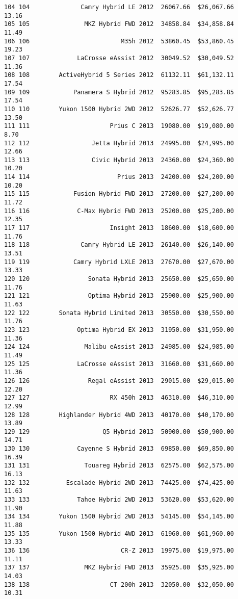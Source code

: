 \documentclass[
  letterpaper,
  DIV=11,
  numbers=noendperiod]{scrreprt}
\begin{document}
\begin{verbatim}
104 104              Camry Hybrid LE 2012  26067.66  $26,067.66       13.16
105 105               MKZ Hybrid FWD 2012  34858.84  $34,858.84       11.49
106 106                         M35h 2012  53860.45  $53,860.45       19.23
107 107             LaCrosse eAssist 2012  30049.52  $30,049.52       11.36
108 108        ActiveHybrid 5 Series 2012  61132.11  $61,132.11       17.54
109 109            Panamera S Hybrid 2012  95283.85  $95,283.85       17.54
110 110        Yukon 1500 Hybrid 2WD 2012  52626.77  $52,626.77       13.50
111 111                      Prius C 2013  19080.00  $19,080.00        8.70
112 112                 Jetta Hybrid 2013  24995.00  $24,995.00       12.66
113 113                 Civic Hybrid 2013  24360.00  $24,360.00       10.20
114 114                        Prius 2013  24200.00  $24,200.00       10.20
115 115            Fusion Hybrid FWD 2013  27200.00  $27,200.00       11.72
116 116             C-Max Hybrid FWD 2013  25200.00  $25,200.00       12.35
117 117                      Insight 2013  18600.00  $18,600.00       11.76
118 118              Camry Hybrid LE 2013  26140.00  $26,140.00       13.51
119 119            Camry Hybrid LXLE 2013  27670.00  $27,670.00       13.33
120 120                Sonata Hybrid 2013  25650.00  $25,650.00       11.76
121 121                Optima Hybrid 2013  25900.00  $25,900.00       11.63
122 122        Sonata Hybrid Limited 2013  30550.00  $30,550.00       11.76
123 123             Optima Hybrid EX 2013  31950.00  $31,950.00       11.36
124 124               Malibu eAssist 2013  24985.00  $24,985.00       11.49
125 125             LaCrosse eAssist 2013  31660.00  $31,660.00       11.36
126 126                Regal eAssist 2013  29015.00  $29,015.00       12.20
127 127                      RX 450h 2013  46310.00  $46,310.00       12.99
128 128        Highlander Hybrid 4WD 2013  40170.00  $40,170.00       13.89
129 129                    Q5 Hybrid 2013  50900.00  $50,900.00       14.71
130 130             Cayenne S Hybrid 2013  69850.00  $69,850.00       16.39
131 131               Touareg Hybrid 2013  62575.00  $62,575.00       16.13
132 132          Escalade Hybrid 2WD 2013  74425.00  $74,425.00       11.63
133 133             Tahoe Hybrid 2WD 2013  53620.00  $53,620.00       11.90
134 134        Yukon 1500 Hybrid 2WD 2013  54145.00  $54,145.00       11.88
135 135        Yukon 1500 Hybrid 4WD 2013  61960.00  $61,960.00       13.33
136 136                         CR-Z 2013  19975.00  $19,975.00       11.11
137 137               MKZ Hybrid FWD 2013  35925.00  $35,925.00       14.03
138 138                      CT 200h 2013  32050.00  $32,050.00       10.31

\end{verbatim}
\end{document}

